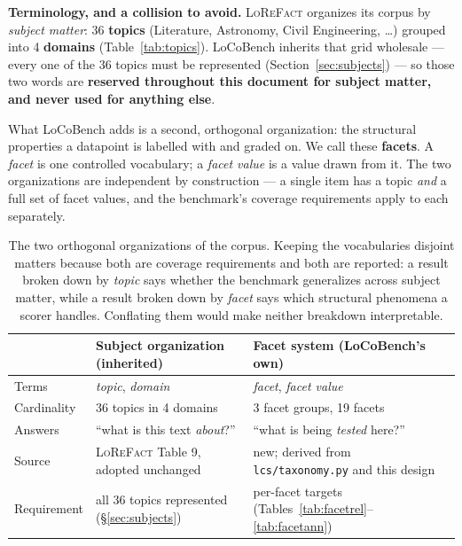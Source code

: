\documentclass[11pt]{article}
\begin{document}
\noindent\textbf{Terminology, and a collision to avoid.}
\textsc{LoReFact} organizes its corpus by \emph{subject matter}: 36 \textbf{topics}
(Literature, Astronomy, Civil Engineering, \ldots) grouped into 4 \textbf{domains}
(Table~\ref{tab:topics}). LoCoBench inherits that grid wholesale --- every one of the 36 topics
must be represented (Section~\ref{sec:subjects}) --- so those two words are \textbf{reserved
throughout this document for subject matter, and never used for anything else}.

What LoCoBench adds is a second, orthogonal organization: the structural properties a datapoint
is labelled with and graded on. We call these \textbf{facets}. A \emph{facet} is one controlled
vocabulary; a \emph{facet value} is a value drawn from it. The two organizations are
independent by construction --- a single item has a topic \emph{and} a full set of facet values,
and the benchmark's coverage requirements apply to each separately.

\begin{table}[!ht]\centering\small
\renewcommand{\arraystretch}{1.15}
\begin{tabular}{@{}lp{5.0cm}p{6.6cm}@{}}
\toprule
 & \textbf{Subject organization} (inherited) & \textbf{Facet system} (LoCoBench's own)\\
\midrule
Terms       & \emph{topic}, \emph{domain} & \emph{facet}, \emph{facet value}\\
Cardinality & 36 topics in 4 domains & 3 facet groups, 19 facets\\
Answers     & ``what is this text \emph{about}?'' &
              ``what is being \emph{tested} here?''\\
Source      & \textsc{LoReFact} Table 9, adopted unchanged &
              new; derived from \texttt{lcs/taxonomy.py} and this design\\
Requirement & all 36 topics represented (\S\ref{sec:subjects}) &
              per-facet targets (Tables~\ref{tab:facetrel}--\ref{tab:facetann})\\
\bottomrule
\end{tabular}
\caption{The two orthogonal organizations of the corpus. Keeping the vocabularies disjoint
matters because both are coverage requirements and both are reported: a result broken down by
\emph{topic} says whether the benchmark generalizes across subject matter, while a result broken
down by \emph{facet} says which structural phenomena a scorer handles. Conflating them would
make neither breakdown interpretable.}
\label{tab:twoaxes}
\end{table}
\end{document}
